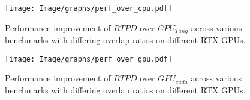\begin{figure}[t]
    \centering
    \texttt{[image: Image/graphs/perf\_over\_cpu.pdf]}
    \caption{Performance improvement of $RTPD$ over $CPU_{Tang}$ across various benchmarks with differing overlap ratios on different RTX GPUs.}
    \label{fig:perf_over_cpu}
\end{figure}
%
\begin{figure}[t]
    \centering
    \texttt{[image: Image/graphs/perf\_over\_gpu.pdf]}
    \caption{Performance improvement of $RTPD$ over $GPU_{cuda}$ across various benchmarks with differing overlap ratios on different RTX GPUs.}
    \label{fig:perf_over_gpu}
\end{figure}